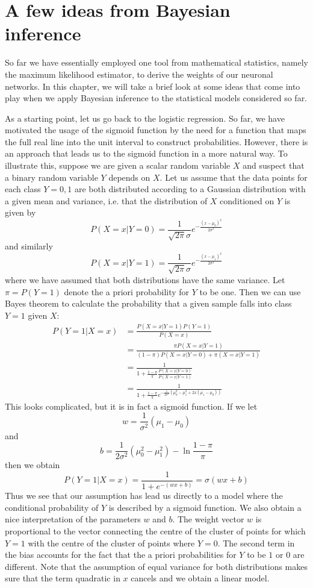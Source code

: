 \documentclass[a4paper, draft]{report}
\numberwithin{section}{chapter}
\numberwithin{equation}{chapter}
\theoremstyle{own}
\theoremstyle{remark}
\begin{document}
\chapter{A few ideas from Bayesian inference}
\label{chap:ideasfrombayesianinference}

So far we have essentially employed one tool from mathematical statistics, namely the maximum likelihood estimator, to derive the weights of our neuronal networks. In this chapter, we will take a brief look at some ideas that come into play when we apply Bayesian inference to the statistical models considered so far.

As a starting point, let us go back to the logistic regression. So far, we have motivated the usage of the sigmoid function by the need for a function that maps the full real line into the unit interval to construct probabilities. However, there is an approach that leads us to the sigmoid function in a more natural way. To illustrate this, suppose we are given a scalar random variable $X$ and suspect that a binary random variable $Y$ depends on $X$. Let us assume that the data points for each class $Y = 0,1$ are both distributed according to a Gaussian distribution with a given mean and variance, i.e. that the distribution of $X$ conditioned on $Y$ is given by
$$
P(X = x | Y = 0) =  \frac{1}{\sqrt{2\pi} \sigma} e^{- \frac{(x - \mu_0)^2}{2\sigma^2}} 
$$
and similarly
$$
P(X = x | Y = 1) =  \frac{1}{\sqrt{2\pi} \sigma} e^{- \frac{(x - \mu_1)^2}{2\sigma^2}} 
$$
where we have assumed that both distributions have the same variance. Let $\pi = P(Y = 1)$ denote the a priori probability for $Y$ to be one. Then we can use Bayes theorem to calculate the probability that a given sample falls into class $Y = 1$ given $X$:
\begin{align*}
P(Y=1 | X = x) &= \frac{P(X = x | Y = 1)P(Y=1)}{P(X = x)} \\
&= \frac{\pi P(X = x | Y = 1)}{(1 - \pi)P(X = x | Y = 0) + \pi (X = x | Y = 1)} \\
&= \frac{1}{1 + \frac{1-\pi}{\pi} \frac{P(X = x | Y = 0)}{P(X = x | Y = 1)}} \\
&= \frac{1}{1 + \frac{1-\pi}{\pi} e^{- \frac{1}{2\sigma^2} (\mu_0^2 - \mu_1^2 + 2 x(\mu_1 - \mu_0))}}
\end{align*} 
This looks complicated, but it is in fact a sigmoid function. If we let 
$$
w = \frac{1}{\sigma^2} (\mu_1 - \mu_0)
$$
and
$$
b =  \frac{1}{2\sigma^2}(\mu_0^2 - \mu_1^2) - \ln \frac{1-\pi}{\pi}
$$
then we obtain
$$
P(Y = 1 | X = x) = \frac{1}{1 + e^{-(wx + b)}} = \sigma(wx + b)
$$
Thus we see that our assumption has lead us directly to a model where the conditional probability of $Y$ is described by a sigmoid function. We also obtain a nice interpretation of the parameters $w$ and $b$. The weight vector $w$ is proportional to the vector connecting the centre of the cluster of points for which $Y = 1$ with the centre of the cluster of points where $Y = 0$. The second term in the bias accounts for the fact that the a priori probabilities for $Y$ to be $1$ or $0$ are different. Note that the assumption of equal variance for both distributions makes sure that the term quadratic in $x$ cancels and we obtain a linear model. 
\end{document}
